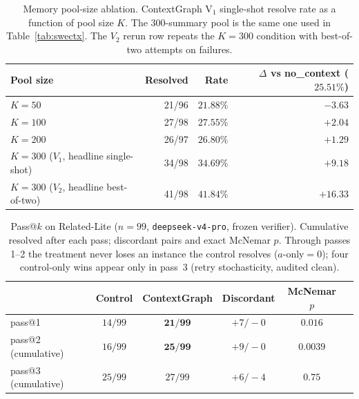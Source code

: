 \begin{table}[h]
\centering
\caption{Memory pool-size ablation. ContextGraph V$_1$ single-shot resolve rate as a function of pool size $K$. The 300-summary pool is the same one used in Table~\ref{tab:swectx}. The $V_2$ rerun row repeats the $K{=}300$ condition with best-of-two attempts on failures.}
\label{tab:swectx-poolsize}
\small
\begin{tabular}{lrrr}
\toprule
\textbf{Pool size} & \textbf{Resolved} & \textbf{Rate} & \textbf{$\Delta$ vs no\_context ($25.51\%$)} \\
\midrule
$K{=}50$  & 21/96 & $21.88\%$ & $-3.63$ \\
$K{=}100$ & 27/98 & $27.55\%$ & $+2.04$ \\
$K{=}200$ & 26/97 & $26.80\%$ & $+1.29$ \\
$K{=}300$ ($V_1$, headline single-shot) & 34/98 & $34.69\%$ & $+9.18$ \\
$K{=}300$ ($V_2$, headline best-of-two) & 41/98 & $\mathbf{41.84\%}$ & $\mathbf{+16.33}$ \\
\bottomrule
\end{tabular}
\end{table}

\begin{table}[h]
\centering
\caption{Pass@$k$ on Related-Lite ($n{=}99$, \texttt{deepseek-v4-pro}, frozen verifier). Cumulative resolved after each pass; discordant pairs and exact McNemar $p$. Through passes 1--2 the treatment never loses an instance the control resolves ($a$-only${}={}0$); four control-only wins appear only in pass~3 (retry stochasticity, audited clean).}
\label{tab:swectx-stream}
\small
\begin{tabular}{lccccc}
\toprule
 & \textbf{Control} & \textbf{ContextGraph} & \textbf{Discordant} & \textbf{McNemar $p$} \\
\midrule
pass@1 & $14/99$ & $\mathbf{21/99}$ & $+7/-0$ & $0.016$ \\
pass@2 (cumulative) & $16/99$ & $\mathbf{25/99}$ & $+9/-0$ & $0.0039$ \\
pass@3 (cumulative) & $25/99$ & $27/99$ & $+6/-4$ & $0.75$ \\
\bottomrule
\end{tabular}
\end{table}

